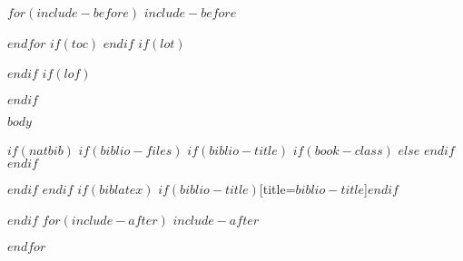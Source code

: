 \documentclass[$if(fontsize)$$fontsize$,$endif$$if(lang)$$lang$,$endif$$if(papersize)$$papersize$,$endif$$for(classoption)$$classoption$$sep$,$endfor$]{$documentclass$}
\begin{document}
$for(include-before)$
$include-before$

$endfor$
$if(toc)$
{
\setcounter{page}{1}
\setcounter{tocdepth}{$toc-depth$}
\tableofcontents
%
\vfill
}
$endif$
$if(lot)$
\listoftables
\vfill
$endif$
$if(lof)$
\listoffigures
\vfill
%
\newpage
$endif$

\setcounter{page}{1}
\pagestyle{fancy}

$body$

$if(natbib)$
$if(biblio-files)$
$if(biblio-title)$
$if(book-class)$
\renewcommand\bibname{$biblio-title$}
$else$
\renewcommand\refname{$biblio-title$}
$endif$
$endif$


$endif$
$endif$
$if(biblatex)$
\printbibliography$if(biblio-title)$[title=$biblio-title$]$endif$

$endif$
$for(include-after)$
$include-after$

$endfor$
\end{document}
